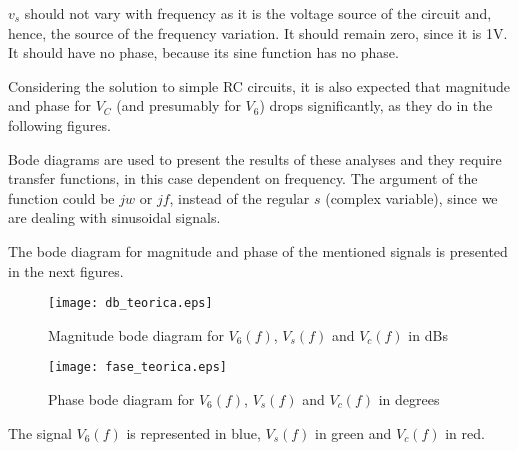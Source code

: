 $v_s$ should not vary with frequency as it is the voltage source of the circuit and, hence, the source of the frequency variation. It should remain zero, since it is 1V. It should have no phase, because its sine function has no phase.

Considering the solution to simple RC circuits, it is also expected that magnitude and phase for $V_C$ (and presumably for $V_6$) drops significantly, as they do in the following figures.

Bode diagrams are used to present the results of these analyses and they require transfer functions, in this case dependent on frequency. The argument of the function could be $jw$ or $jf$, instead of the regular $s$ (complex variable), since we are dealing with sinusoidal signals.

The bode diagram for magnitude and phase of the mentioned signals is presented in the next figures.

\begin{figure}[!ht]
  \centering
  \texttt{[image: db\_teorica.eps]}
  \caption{Magnitude bode diagram for $V_6(f)$, $V_s(f)$ and $V_c(f)$ in dBs}
  \label{bode1}
\end{figure}

\begin{figure}[!ht]
  \centering
  \texttt{[image: fase\_teorica.eps]}
  \caption{Phase bode diagram for $V_6(f)$, $V_s(f)$ and $V_c(f)$ in degrees}
  \label{bode2}
\end{figure}
\newpage

The signal $V_6(f)$ is represented in blue, $V_s(f)$ in green and $V_c(f)$ in red.



